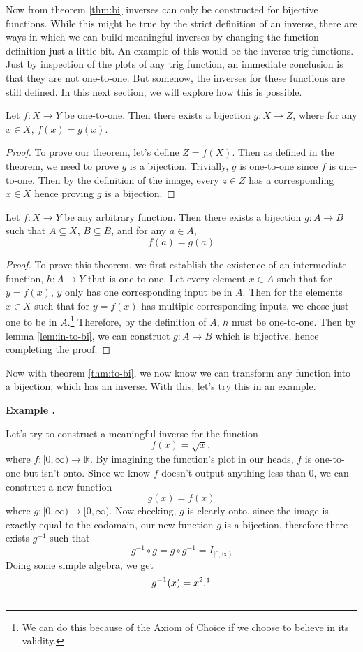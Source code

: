 \documentclass[11pt]{article}
\numberwithin{lemma}{section}
\numberwithin{equation}{section}
\numberwithin{define}{section}
\numberwithin{prop}{section}
\numberwithin{figure}{section}
\numberwithin{theorem}{section}
\newcounter{ex}[section]
\newenvironment{ex}[0]{

	\refstepcounter{ex}
	\begin{large}
    \textbf{Example \theex .}
    \end{large}
    \par
    }
    {
    \subsection*{}
    }
\numberwithin{ex}{section}
\def\real{\mathbb{R}}
\begin{document}
Now from theorem \eqref{thm:bi} inverses can only be constructed for bijective functions. 
While this might be true by the strict definition of an inverse, there are ways in which we can build meaningful inverses by changing the function definition just a little bit. 
An example of this would be the inverse trig functions. Just by inspection of the plots of any trig function, an immediate conclusion is that they are not one-to-one. But somehow, the inverses for these functions are still defined. In this next section, we will explore how this is possible.

\begin{lemma}
\label{lem:in-to-bi}
Let $f:X\to Y$ be one-to-one. Then there exists a bijection $g:X\to Z$, where for any $x\in X$, $f(x)=g(x)$.
\end{lemma}
\begin{proof}
To prove our theorem, let's define $Z=f(X)$. Then as defined in the theorem, we need to prove $g$ is a bijection. Trivially, $g$ is one-to-one since $f$ is one-to-one. Then by the definition of the image, every $z\in Z$ has a corresponding $x\in X$ hence proving $g$ is a bijection.
\end{proof}
\begin{theorem}
\label{thm:to-bi}
Let $f:X\to Y$ be any arbitrary function. Then there exists a bijection $g:A\to B$ such that $A\subseteq X$, $B\subseteq B$, and for any $a\in A$,
$$f(a)=g(a)$$
\end{theorem}
\begin{proof}
	To prove this theorem, we first establish the existence of an intermediate function, ${h:A\to Y}$ that is one-to-one. Let every element $x\in A$ such that for $y=f(x)$, $y$ only has one corresponding input be in $A$. Then for the elements $x\in X$ such that for $y=f(x)$ has multiple corresponding inputs, we chose just one to be in $A$.\footnote{We can do this because of the Axiom of Choice if we choose to believe in its validity.}
	Therefore, by the definition of $A$, $h$ must be one-to-one. Then by lemma \eqref{lem:in-to-bi}, we can construct $g:A\to B$ which is bijective, hence completing the proof. 
\end{proof}

Now with theorem \eqref{thm:to-bi}, we now know we can transform any function into a bijection, which has an inverse. With this, let's try this in an example.
\begin{ex}
	Let's try to construct a meaningful inverse for the function
	$$f(x)=\sqrt{x},$$
	where $f:[0,\infty)\to \real$.
	By imagining the function's plot in our heads, $f$ is one-to-one but isn't onto. Since we know $f$ doesn't output anything less than 0, we can construct a new function 
	$$g(x)=f(x)$$
	where $g:[0,\infty)\to [0,\infty)$. Now checking, $g$ is clearly onto, since the image is exactly equal to the codomain, our new function $g$ is a bijection, therefore there exists $g^{-1}$ such that
	$$g^{-1}\circ g=g\circ g^{-1}=I_{[0,\infty)}$$
	Doing some simple algebra, we get
	$$g^{-1}(x)=x^2.\footnotemark$$
\end{ex}
\end{document}
